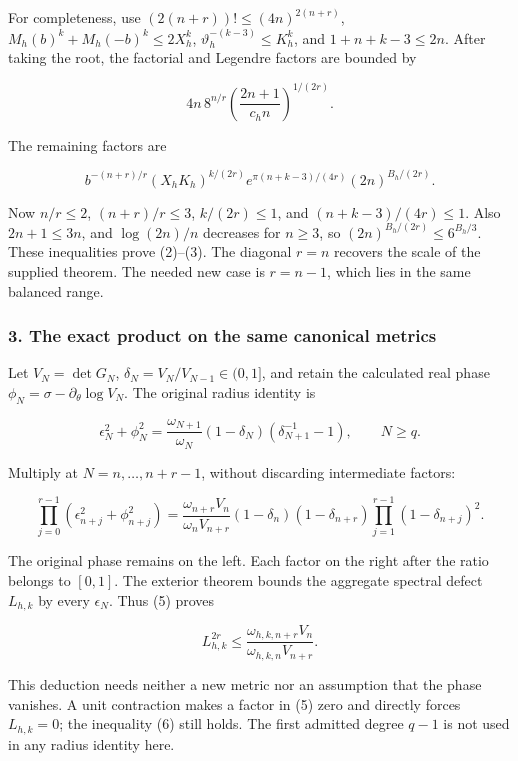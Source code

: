 For completeness, use \((2(n+r))!\le(4n)^{2(n+r)}\), \(M_h(b)^k+M_h(-b)^k\le2X_h^k\), \(\vartheta_h^{-(k-3)}\le K_h^k\), and \(1+n+k-3\le2n\). After taking the root, the factorial and Legendre factors are bounded by

\[
4n\,8^{n/r}\left(\frac{2n+1}{c_h n}\right)^{1/(2r)}.
\]

The remaining factors are

\[
b^{-(n+r)/r}(X_hK_h)^{k/(2r)}
e^{\pi(n+k-3)/(4r)}(2n)^{B_h/(2r)}.
\]

Now \(n/r\le2\), \((n+r)/r\le3\), \(k/(2r)\le1\), and \((n+k-3)/(4r)\le1\). Also \(2n+1\le3n\), and \(\log(2n)/n\) decreases for \(n\ge3\), so \((2n)^{B_h/(2r)}\le6^{B_h/3}\). These inequalities prove (2)--(3). The diagonal \(r=n\) recovers the scale of the supplied theorem. The needed new case is \(r=n-1\), which lies in the same balanced range.

\subsubsection{3. The exact product on the same canonical metrics}\label{endpoint-four_volume_threshold--the-exact-product-on-the-same-canonical-metrics}

Let \(V_N=\det G_N\), \(\delta_N=V_N/V_{N-1}\in(0,1]\), and retain the calculated real phase \(\phi_N=\sigma-\partial_\theta\log V_N\). The original radius identity is

\[
\epsilon_N^2+\phi_N^2
=\frac{\omega_{N+1}}{\omega_N}
 (1-\delta_N)(\delta_{N+1}^{-1}-1),\qquad N\ge q.
\]

Multiply at \(N=n,\ldots,n+r-1\), without discarding intermediate factors:

\[
\prod_{j=0}^{r-1}(\epsilon_{n+j}^2+\phi_{n+j}^2)
=\frac{\omega_{n+r}V_n}{\omega_nV_{n+r}}
(1-\delta_n)(1-\delta_{n+r})
\prod_{j=1}^{r-1}(1-\delta_{n+j})^2.
\tag{5}
\]

The original phase remains on the left. Each factor on the right after the ratio belongs to \([0,1]\). The exterior theorem bounds the aggregate spectral defect \(L_{h,k}\) by every \(\epsilon_N\). Thus (5) proves

\[
L_{h,k}^{2r}\le
\frac{\omega_{h,k,n+r}V_n}{\omega_{h,k,n}V_{n+r}}.
\tag{6}
\]

This deduction needs neither a new metric nor an assumption that the phase vanishes. A unit contraction makes a factor in (5) zero and directly forces \(L_{h,k}=0\); the inequality (6) still holds. The first admitted degree \(q-1\) is not used in any radius identity here.

